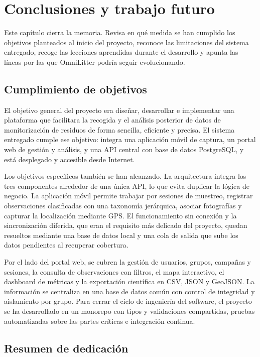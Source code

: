 \chapter{Conclusiones y trabajo futuro}

Este capítulo cierra la memoria. Revisa en qué medida se han cumplido los objetivos
planteados al inicio del proyecto, reconoce las limitaciones del sistema entregado,
recoge las lecciones aprendidas durante el desarrollo y apunta las líneas por las que
OmniLitter podría seguir evolucionando.

\section{Cumplimiento de objetivos}

El objetivo general del proyecto era diseñar, desarrollar e implementar una plataforma
que facilitara la recogida y el análisis posterior de datos de monitorización de
residuos de forma sencilla, eficiente y precisa. El sistema entregado cumple ese
objetivo: integra una aplicación móvil de captura, un portal web de gestión y análisis,
y una API central con base de datos PostgreSQL, y está desplegado y accesible desde
Internet.

Los objetivos específicos también se han alcanzado. La arquitectura integra los tres
componentes alrededor de una única API, lo que evita duplicar la lógica de negocio. La
aplicación móvil permite trabajar por sesiones de muestreo, registrar observaciones
clasificadas con una taxonomía jerárquica, asociar fotografías y capturar la
localización mediante GPS. El funcionamiento sin conexión y la sincronización diferida,
que eran el requisito más delicado del proyecto, quedan resueltos mediante una base de
datos local y una cola de salida que sube los datos pendientes al recuperar cobertura.

Por el lado del portal web, se cubren la gestión de usuarios, grupos, campañas y
sesiones, la consulta de observaciones con filtros, el mapa interactivo, el dashboard de
métricas y la exportación científica en CSV, JSON y GeoJSON. La información se centraliza en
una base de datos común con control de integridad y aislamiento por grupo. Para cerrar
el ciclo de ingeniería del software, el proyecto se ha desarrollado en un monorepo con
tipos y validaciones compartidas, pruebas automatizadas sobre las partes críticas e
integración continua.

\section{Resumen de dedicación}

